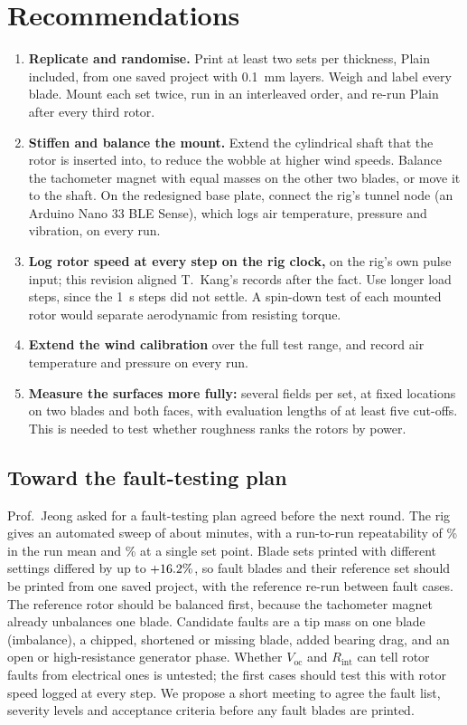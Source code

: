 \documentclass[11pt]{article}
\begin{document}
\section{Recommendations}\label{sec:next}
\begin{enumerate}
  \item \textbf{Replicate and randomise.} Print at least two sets per thickness, Plain included,
        from one saved project with \SI{0.1}{mm} layers. Weigh and label every blade. Mount each
        set twice, run in an interleaved order, and re-run Plain after every third rotor.
  \item \textbf{Stiffen and balance the mount.} Extend the cylindrical shaft that the rotor is
        inserted into, to reduce the wobble at higher wind speeds. Balance the tachometer magnet
        with equal masses on the other two blades, or move it to the shaft. On the redesigned base
        plate, connect the rig's tunnel node (an Arduino Nano 33 BLE Sense), which logs air
        temperature, pressure and vibration, on every run.
  \item \textbf{Log rotor speed at every step on the rig clock,} on the rig's own pulse input; this
        revision aligned T.~Kang's records after the fact. Use longer load steps, since the
        \SI{1}{s} steps did not settle. A spin-down test of each mounted rotor would separate
        aerodynamic from resisting torque.
  \item \textbf{Extend the wind calibration} over the full test range, and record air temperature
        and pressure on every run.
  \item \textbf{Measure the surfaces more fully:} several fields per set, at fixed locations on two
        blades and both faces, with evaluation lengths of at least five cut-offs. This is needed to
        test whether roughness ranks the rotors by power.
\end{enumerate}

\subsection{Toward the fault-testing plan}\label{sec:faults}
Prof.\ Jeong asked for a fault-testing plan agreed before the next round. The rig gives an
automated sweep of about \runMin{} minutes, with a run-to-run repeatability of \sigRun\% in the run
mean and \sigE\% at a single set point. Blade sets printed with different settings differed by up to
$+16.2\%$, so fault blades and their reference set should be printed from one saved project, with
the reference re-run between fault cases. The reference rotor should be balanced first, because the tachometer magnet already unbalances
one blade. Candidate faults are a tip mass on one blade (imbalance),
a chipped, shortened or missing blade, added bearing drag, and an open or high-resistance generator
phase. Whether $V_\mathrm{oc}$ and $R_\mathrm{int}$ can tell rotor faults from electrical ones is
untested; the first cases should test this with rotor speed logged at every step. We propose a short
meeting to agree the fault list, severity levels and acceptance criteria before any fault blades
are printed.
\end{document}
